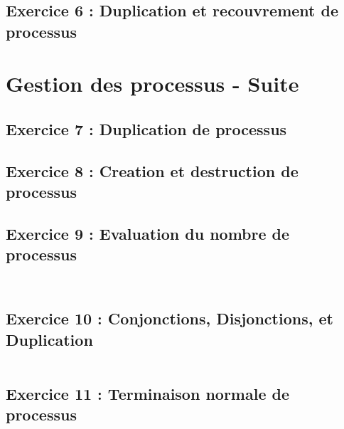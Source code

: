 \subsection{Exercice 6 : Duplication et recouvrement de processus}

\section{Gestion des processus - Suite}

\subsection{Exercice 7 : Duplication de processus}

\subsection{Exercice 8 : Creation et destruction de processus}

\subsection{Exercice 9 : Evaluation du nombre de processus}
\inputminted[linenos,firstline=5, lastline=9]{cpp}{../sources/cpp/TP5-6/ex9-programme1.c}
\inputminted[linenos,firstline=5, lastline=9]{cpp}{../sources/cpp/TP5-6/ex9-programme2.c}

\subsection{Exercice 10 : Conjonctions, Disjonctions, et Duplication}

\inputminted[linenos,firstline=5, lastline=8]{cpp}{../sources/cpp/TP5-6/ex10-conjonction1.c}

\subsection{Exercice 11 : Terminaison normale de processus}

\inputminted[linenos,firstline=5, lastline=19]{cpp}{../sources/cpp/TP5-6/ex11-programme3.c}
